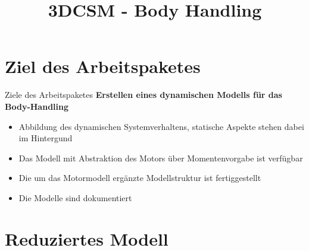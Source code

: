\documentclass[10pt,xcolor=dvipsnames]{beamer}
\title{3DCSM - Body Handling}
\author{}
\date{}
\begin{document}
{
\begin{frame}
	\titlepage
\end{frame}
}
\addtocounter{framenumber}{-1}
\begin{frame}
    \tableofcontents
\end{frame}

\section{Ziel des Arbeitspaketes}
	\begin{frame}{Ziele des Arbeitspaketes}
		\textbf{Erstellen eines dynamischen Modells für das Body-Handling}
		\begin{itemize}
			\item Abbildung des dynamischen Systemverhaltens, statische Aspekte stehen dabei im Hintergund
			\item Das Modell mit Abstraktion des Motors über Momentenvorgabe ist verfügbar
			\item Die um das Motormodell ergänzte Modellstruktur ist fertiggestellt
			\item Die Modelle sind dokumentiert
		\end{itemize}
	\end{frame}

\section{Reduziertes Modell}
\end{document}
